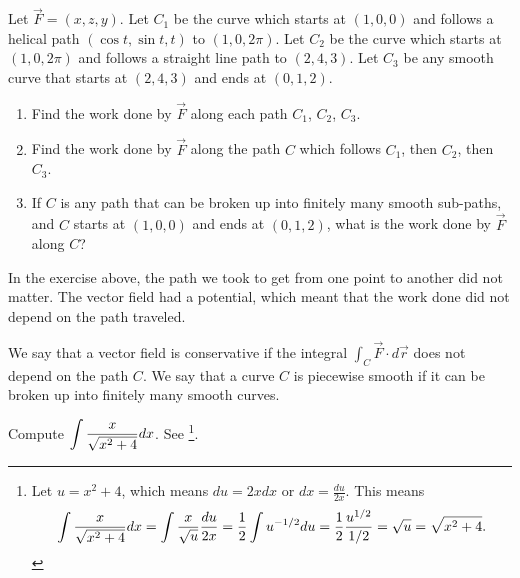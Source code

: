 
\begin{problem}%
  Let $\vec F = (x,z,y)$. Let $C_1$ be the curve which starts at $(1,0,0)$ and follows a helical path $(\cos t, \sin t, t)$ to $(1,0,2\pi)$. Let $C_2$ be the curve which starts at $(1,0, 2\pi)$ and follows a straight line path to $(2,4,3)$. Let $C_3$ be any smooth curve that starts at $(2,4,3)$ and ends at $(0,1,2)$.
 \begin{enumerate}
  \item Find the work done by $\vec F$ along each path $C_1$, $C_2$, $C_3$. 
  \item Find the work done by $\vec F$ along the path $C$ which follows $C_1$, then $C_2$, then $C_3$.  
  \item If $C$ is any path that can be broken up into finitely many smooth sub-paths, and $C$ starts at $(1,0,0)$ and ends at $(0,1,2)$, what is the work done by $\vec F$ along $C$?
 \end{enumerate}
\end{problem}

In the exercise above, the path we took to get from one point to another did not matter. The vector field had a potential, which meant that the work done did not depend on the path traveled. 
\begin{definition}
 We say that a vector field is conservative if the integral $\int_C \vec F\cdot d\vec r$ does not depend on the path $C$. We say that a curve $C$ is piecewise smooth if it can be broken up into finitely many smooth curves.
\end{definition}
 
\begin{review*}
 Compute $\displaystyle \int \frac{x}{\sqrt{x^2+4}}dx$. See \footnote{
Let $u=x^2+4$, which means $du=2xdx$ or $dx=\frac{du}{2x}$.  This means
$$\displaystyle \int \frac{x}{\sqrt{x^2+4}}dx 
= \int \frac{x}{\sqrt{u}}\frac{du}{2x} 
= \frac{1}{2}\int u^{-1/2}du
= \frac{1}{2}\frac{u^{1/2}}{1/2}
= \sqrt{u} = \sqrt{x^2+4}.
$$
}.
\end{review*}


